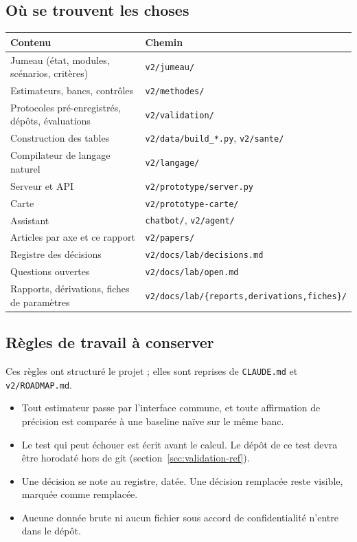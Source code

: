 \subsection{Où se trouvent les choses}
\begin{center}\small
\begin{tabular}{@{}ll@{}}
\toprule
Contenu & Chemin \\
\midrule
Jumeau (état, modules, scénarios, critères) & \texttt{v2/jumeau/} \\
Estimateurs, bancs, contrôles & \texttt{v2/methodes/} \\
Protocoles pré-enregistrés, dépôts, évaluations & \texttt{v2/validation/} \\
Construction des tables & \texttt{v2/data/build\_*.py}, \texttt{v2/sante/} \\
Compilateur de langage naturel & \texttt{v2/langage/} \\
Serveur et API & \texttt{v2/prototype/server.py} \\
Carte & \texttt{v2/prototype-carte/} \\
Assistant & \texttt{chatbot/}, \texttt{v2/agent/} \\
Articles par axe et ce rapport & \texttt{v2/papers/} \\
Registre des décisions & \texttt{v2/docs/lab/decisions.md} \\
Questions ouvertes & \texttt{v2/docs/lab/open.md} \\
Rapports, dérivations, fiches de paramètres & \texttt{v2/docs/lab/\{reports,derivations,fiches\}/} \\
\bottomrule
\end{tabular}
\end{center}

\subsection{Règles de travail à conserver}
Ces règles ont structuré le projet ; elles sont reprises de \texttt{CLAUDE.md} et \texttt{v2/ROADMAP.md}.
\begin{itemize}
\item Tout estimateur passe par l'interface commune, et toute affirmation de précision est comparée à une baseline
  naïve sur le même banc.
\item Le test qui peut échouer est écrit avant le calcul. Le dépôt de ce test devra être horodaté hors de git
  (section~\ref{sec:validation-ref}).
\item Une décision se note au registre, datée. Une décision remplacée reste visible, marquée comme remplacée.
\item Aucune donnée brute ni aucun fichier sous accord de confidentialité n'entre dans le dépôt.
\end{itemize}

